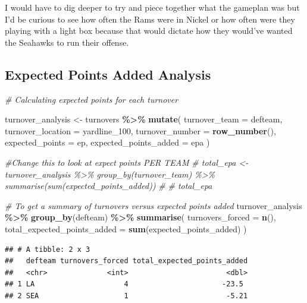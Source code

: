 \documentclass[
]{article}
\newenvironment{Shaded}{\begin{snugshade}}{\end{snugshade}}
\newcommand{\AttributeTok}[1]{\textcolor[rgb]{0.13,0.29,0.53}{#1}}
\newcommand{\CommentTok}[1]{\textcolor[rgb]{0.56,0.35,0.01}{\textit{#1}}}
\newcommand{\FunctionTok}[1]{\textcolor[rgb]{0.13,0.29,0.53}{\textbf{#1}}}
\newcommand{\NormalTok}[1]{#1}
\newcommand{\OtherTok}[1]{\textcolor[rgb]{0.56,0.35,0.01}{#1}}
\newcommand{\SpecialCharTok}[1]{\textcolor[rgb]{0.81,0.36,0.00}{\textbf{#1}}}
\begin{document}
I would have to dig deeper to try and piece together what the gameplan
was but I'd be curious to see how often the Rams were in Nickel or how
often were they playing with a light box because that would dictate how
they would've wanted the Seahawks to run their offense.

\subsection{Expected Points Added
Analysis}\label{expected-points-added-analysis}

\begin{Shaded}
\begin{Highlighting}[]
\CommentTok{\# Calculating expected points for each turnover}

\NormalTok{turnover\_analysis }\OtherTok{\textless{}{-}}\NormalTok{ turnovers }\SpecialCharTok{\%\textgreater{}\%}
  \FunctionTok{mutate}\NormalTok{(}
    \AttributeTok{turnover\_team =}\NormalTok{ defteam,}
    \AttributeTok{turnover\_location =}\NormalTok{ yardline\_100,}
    \AttributeTok{turnover\_number =} \FunctionTok{row\_number}\NormalTok{(),}
    \AttributeTok{expected\_points =}\NormalTok{ ep,}
    \AttributeTok{expected\_points\_added =}\NormalTok{ epa}
\NormalTok{  )}


\CommentTok{\#Change this to look at expect points PER TEAM}
\CommentTok{\# total\_epa \textless{}{-} turnover\_analysis \%\textgreater{}\% group\_by(turnover\_team) \%\textgreater{}\%         summarise(sum(expected\_points\_added))}
\CommentTok{\# }
\CommentTok{\# total\_epa}
\end{Highlighting}
\end{Shaded}

\begin{Shaded}
\begin{Highlighting}[]
\CommentTok{\# To get a summary of turnovers versus expected points added}
\NormalTok{turnover\_analysis }\SpecialCharTok{\%\textgreater{}\%}
    \FunctionTok{group\_by}\NormalTok{(defteam) }\SpecialCharTok{\%\textgreater{}\%} \FunctionTok{summarise}\NormalTok{(}
        \AttributeTok{turnovers\_forced =} \FunctionTok{n}\NormalTok{(),}
        \AttributeTok{total\_expected\_points\_added =} \FunctionTok{sum}\NormalTok{(expected\_points\_added)}
\NormalTok{    )}
\end{Highlighting}
\end{Shaded}

\begin{verbatim}
## # A tibble: 2 x 3
##   defteam turnovers_forced total_expected_points_added
##   <chr>              <int>                       <dbl>
## 1 LA                     4                      -23.5 
## 2 SEA                    1                       -5.21
\end{verbatim}
\end{document}
